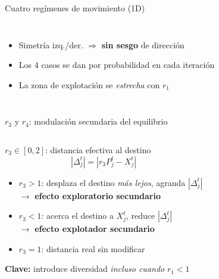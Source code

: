 \documentclass[aspectratio=169]{beamer}
\newcommand{\good}[1]{\textcolor{mygreen}{\textbf{#1}}}
\renewcommand{\accent}[1]{\textcolor{myyellow}{\textbf{#1}}}
\begin{document}
\begin{frame}{Cuatro regímenes de movimiento (1D)}
\begin{columns}[T]
      \vspace{0.6em}
      \begin{itemize}
        \item Simetría izq./der. $\Rightarrow$ \textbf{sin sesgo} de dirección
        \item Los 4 casos se dan por probabilidad en cada iteración
        \item La zona de explotación se \textit{estrecha} con $r_1$
      \end{itemize}
  \end{columns}
\end{frame}

\begin{frame}{$r_3$ y $r_4$: modulación secundaria del equilibrio}
  \begin{columns}[T]
      \begin{block}{$r_3 \in [0,2]$: distancia efectiva al destino}
        \[|\Delta_j^t| = |r_3 P_j^t - X_j^t|\]
        \begin{itemize}
          \item $r_3 > 1$: desplaza el destino \textit{más lejos}, agranda $|\Delta_j^t|$\\
                $\to$ \good{efecto exploratorio secundario}
          \item $r_3 < 1$: acerca el destino a $X_j^t$, reduce $|\Delta_j^t|$\\
                $\to$ \accent{efecto explotador secundario}
          \item $r_3 = 1$: distancia real sin modificar
        \end{itemize}
        \textbf{Clave:} introduce diversidad \emph{incluso cuando} $r_1 < 1$
      \end{block}


\end{columns}
\end{frame}
\end{document}
